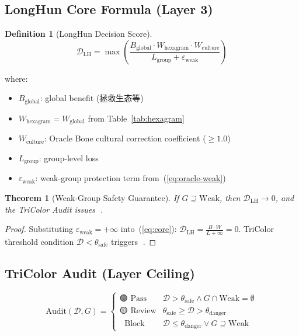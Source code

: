 \documentclass[conference]{IEEEtran}
\newtheorem{theorem}{Theorem}
\newtheorem{definition}{Definition}
\begin{document}
\subsection{LongHun Core Formula (Layer 3)}

\begin{definition}[LongHun Decision Score]
\begin{equation}
  \mathcal{D}_{\text{LH}}
  = \max\!\left(
      \frac{
        B_{\text{global}} \cdot W_{\text{hexagram}}
        \cdot W_{\text{culture}}
      }{
        L_{\text{group}} + \varepsilon_{\text{weak}}
      }
    \right)
  \label{eq:core}
\end{equation}
\end{definition}

where:
\begin{itemize}
  \item $B_{\text{global}}$: global benefit (拯救生态等)
  \item $W_{\text{hexagram}} = W_{\text{global}}$ from
    Table~\ref{tab:hexagram}
  \item $W_{\text{culture}}$: Oracle Bone cultural
    correction coefficient ($\geq 1.0$)
  \item $L_{\text{group}}$: group-level loss
  \item $\varepsilon_{\text{weak}}$:
    weak-group protection term from~(\ref{eq:oracle-weak})
\end{itemize}

\begin{theorem}[Weak-Group Safety Guarantee]
If $G \supseteq \text{Weak}$, then
$\mathcal{D}_{\text{LH}} \to 0$,
and the TriColor Audit issues 🔴.
\end{theorem}

\begin{proof}
Substituting $\varepsilon_{\text{weak}} = +\infty$
into~(\ref{eq:core}):
$\mathcal{D}_{\text{LH}} = \frac{B \cdot W}{L + \infty}
= 0$.
TriColor threshold condition $\mathcal{D} < \theta_{\text{safe}}$
triggers 🔴.
\end{proof}

\subsection{TriColor Audit (Layer Ceiling)}

\begin{equation}
  \text{Audit}(\mathcal{D}, G) =
  \begin{cases}
    \text{🟢 Pass}    &
      \mathcal{D} > \theta_{\text{safe}}
      \land G \cap \text{Weak} = \emptyset \\[4pt]
    \text{🟡 Review}  &
      \theta_{\text{safe}} \geq \mathcal{D}
      > \theta_{\text{danger}} \\[4pt]
    \text{🔴 Block}   &
      \mathcal{D} \leq \theta_{\text{danger}}
      \lor G \supseteq \text{Weak}
  \end{cases}
  \label{eq:tricolor}
\end{equation}
\end{document}

